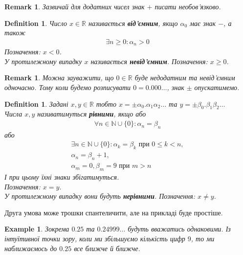\documentclass[a4paper, 14pt]{article}
\theoremstyle{theoremdd}
\theoremstyle{theoremdd}
\newtheorem{definition}[theorem]{Definition}
\theoremstyle{theoremdd}
\theoremstyle{theoremdd}
\newtheorem{example}[theorem]{Example}
\theoremstyle{theoremdd}
\theoremstyle{theoremdd}
\newtheorem{remark}[theorem]{Remark}
\theoremstyle{theoremdd}
\theoremstyle{theoremdd}
\begin{document}
	\begin{remark}
	Зазвичай для додатних чисел знак $+$ писати необов'язково.
	\end{remark}

	\begin{definition}
	Число $x \in \mathbb{R}$ називається \textbf{від'ємним}, якщо $\alpha_0$ має знак $-$, а також
	\begin{align*}
	\exists n \geq 0: \alpha_n > 0
	\end{align*}
	Позначення: $x < 0$.\\
	У протилежному випадку $x$ називається \textbf{невід'ємним}. Позначення: $x \geq 0$.
	\end{definition}
	
	\begin{remark}
	Можна зауважити, що $0 \in \mathbb{R}$ буде недодатним та невід'ємним одночасно. Тому коли будемо розписувати $0 = 0.000 \dots$, знак $\pm$ опускатимемо.
	\end{remark}
	
	\begin{definition}
	Задані $x,y \in \mathbb{R}$ тобто $x = \pm \alpha_0.\alpha_1 \alpha_2 \dots$ та $y = \pm \beta_0.\beta_1 \beta_2 \dots$\\
	Числа $x,y$ називатимуться \textbf{рівними}, якщо або
	\begin{align*}
	\forall n \in \mathbb{N} \cup \{0\}: \alpha_n = \beta_n
	\end{align*}
	або
	\begin{align*}
	\exists n \in \mathbb{N} \cup \{0\}: \alpha_k = \beta_k \text{ при } 0 \leq k < n, \\ \alpha_n = \beta_n + 1, \\\alpha_m = 0, \beta_m = 9 \text{ при } m > n
	\end{align*}
	І при цьому їхні знаки збігатимуться.\\
	Позначення: $x = y$.\\
	У протилежному випадку вони будуть \textbf{нерівними}. Позначення: $x \neq y$.
	\end{definition}
	
	Друга умова може трошки спантеличити, але на прикладі буде простіше.
	
	\begin{example}
	Зокрема $0.25$ та $0.24999 \dots$ будуть вважатись однаковими. Із інтуїтивної точки зору, коли ми збільшуємо кількість цифр $9$, то ми наближаємось до $0.25$ все ближче й ближче.
	\end{example}
	
\end{document}

